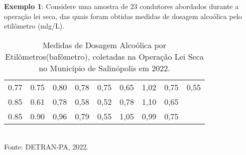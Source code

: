 \begin{table}[!htb]
\end{table}
\vskip0.1cm

\newpage

\textbf{Exemplo 1}: Considere uma amostra de 23 condutores abordados durante a operação lei seca, das
quais foram obtidas medidas de dosagem alcoólica pelo etilômetro (mlg/L).\vskip0.3cm


\begin{table}[!htb]
    \centering
    {
    \caption{Medidas de Dosagem Alcoólica por Etilômetros(bafômetro), coletadas na Operação Lei Seca no Município de Salinópolis em 2022.}
    \label{estatura}
    \vspace{0.2cm}
\begin{tabular}{c|c|c|c|c|c|c|c|c}
  \hline\hline
  0.77 & 0.75 & 0,80 & 0,78 & 0,75 & 0,65 & 1,02 & 0,75 & 0,55 \\
  0.85 & 0.61 & 0,78 & 0,58 & 0,52 & 0,78 & 1,10 & 0,65 &    \\
  0.85 & 0.90 & 0,96 & 0,79 & 0,55 & 1,05 & 0,99 & 0,75 &    \\
  \hline\hline
\end{tabular}}
\\
\hspace{-5.5cm}
Fonte: DETRAN-PA, 2022.
\end{table}

